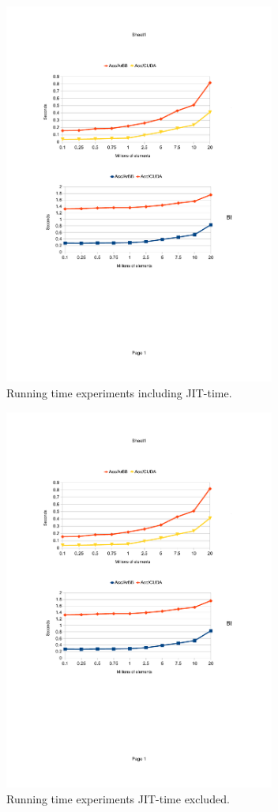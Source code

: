 \documentclass[conference]{IEEEtran}
\begin{document}
\begin{figure}
  \begin{center}
   \includegraphics[width=3.5in]{jit}    
  \end{center}
\vspace{-5mm}
  \caption{Running time experiments including JIT-time.} 
  \label{f:jit}
\end{figure}

\begin{figure}
  \begin{center}
   \includegraphics[width=3.5in]{nojit}    
  \end{center}
\vspace{-5mm}
  \caption{Running time experiments JIT-time excluded.}
  \label{f:nojit}
\end{figure}
\end{document}
